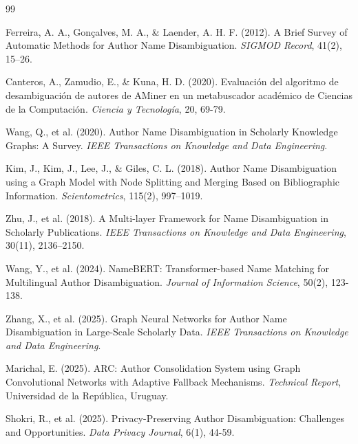\documentclass{article}
\begin{document}
\begin{thebibliography}{99}

Ferreira, A. A., Gonçalves, M. A., \& Laender, A. H. F. (2012).
\newblock A Brief Survey of Automatic Methods for Author Name Disambiguation.
\newblock \emph{SIGMOD Record}, 41(2), 15–26.

Canteros, A., Zamudio, E., \& Kuna, H. D. (2020).
\newblock Evaluación del algoritmo de desambiguación de autores de AMiner en un metabuscador académico de Ciencias de la Computación.
\newblock \emph{Ciencia y Tecnología}, 20, 69-79.

Wang, Q., et al. (2020).
\newblock Author Name Disambiguation in Scholarly Knowledge Graphs: A Survey.
\newblock \emph{IEEE Transactions on Knowledge and Data Engineering}.

Kim, J., Kim, J., Lee, J., \& Giles, C. L. (2018).
\newblock Author Name Disambiguation using a Graph Model with Node Splitting and Merging Based on Bibliographic Information.
\newblock \emph{Scientometrics}, 115(2), 997–1019.

Zhu, J., et al. (2018).
\newblock A Multi-layer Framework for Name Disambiguation in Scholarly Publications.
\newblock \emph{IEEE Transactions on Knowledge and Data Engineering}, 30(11), 2136–2150.

Wang, Y., et al. (2024).
\newblock NameBERT: Transformer-based Name Matching for Multilingual Author Disambiguation.
\newblock \emph{Journal of Information Science}, 50(2), 123-138.

Zhang, X., et al. (2025).
\newblock Graph Neural Networks for Author Name Disambiguation in Large-Scale Scholarly Data.
\newblock \emph{IEEE Transactions on Knowledge and Data Engineering}.

Marichal, E. (2025).
\newblock ARC: Author Consolidation System using Graph Convolutional Networks with Adaptive Fallback Mechanisms.
\newblock \emph{Technical Report}, Universidad de la República, Uruguay.

Shokri, R., et al. (2025).
\newblock Privacy-Preserving Author Disambiguation: Challenges and Opportunities.
\newblock \emph{Data Privacy Journal}, 6(1), 44-59.

\end{thebibliography}
\end{document}
